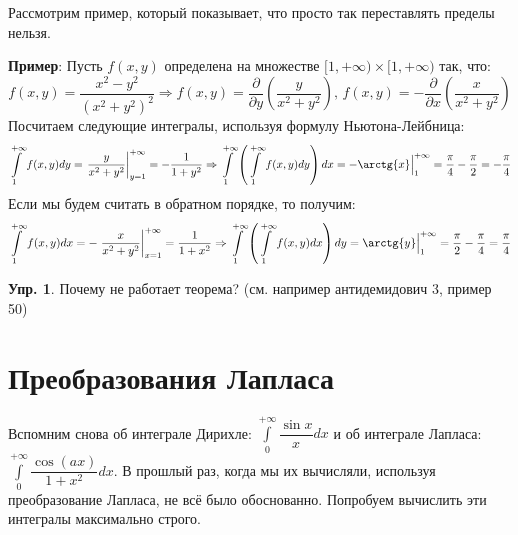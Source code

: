 \documentclass[12pt]{article}
\theoremstyle{definition}
\newtheorem{exrc}{Упр.}
\newcommand{\ddint}[2]{\displaystyle\int\limits_{#1}^{#2}}
\begin{document}
Рассмотрим пример, который показывает, что просто так переставлять пределы нельзя.

\textbf{Пример}: Пусть $f(x,y)$ определена на множестве $[1, +\infty)\times [1,+\infty)$ так, что:
$$
	f(x,y) = \dfrac{x^2 - y^2}{(x^2 + y^2)^2}\Rightarrow f(x,y) = \dfrac{\partial}{\partial y}\left(\dfrac{y}{x^2 + y^2}\right), \, f(x,y) = - \dfrac{\partial}{\partial  x}\left(\dfrac{x}{x^2 + y^2}\right)
$$
Посчитаем следующие интегралы, используя формулу Ньютона-Лейбница:
$$
	\ddint{1}{+\infty}f(x,y)dy = \left.\dfrac{y}{x^2 + y^2}\right|_{y= 1}^{+\infty} = -\dfrac{1}{1 + y^2} \Rightarrow \ddint{1}{+\infty}\left(\ddint{1}{+\infty}f(x,y)dy\right)dx = -\arctg{x}\Big|_{1}^{+\infty} = \dfrac{\pi}{4} - \dfrac{\pi}{2} = -\dfrac{\pi}{4}
$$
Если мы будем считать в обратном порядке, то получим:
$$
	\ddint{1}{+\infty}f(x,y)dx = -\left.\dfrac{x}{x^2 + y^2}\right|_{x= 1}^{+\infty} = \dfrac{1}{1 + x^2} \Rightarrow \ddint{1}{+\infty}\left(\ddint{1}{+\infty}f(x,y)dx\right)dy = \arctg{y}\Big|_{1}^{+\infty} = \dfrac{\pi}{2} - \dfrac{\pi}{4} = \dfrac{\pi}{4}
$$

\begin{exrc}
	Почему не работает теорема? (см. например антидемидович 3, пример 50)
\end{exrc}
\newpage
\section*{Преобразования Лапласа}
Вспомним снова об интеграле Дирихле: $\ddint{0}{+\infty}\dfrac{\sin{x}}{x}dx$
и об интеграле Лапласа: $\ddint{0}{+\infty}\dfrac{\cos{(ax)}}{1 + x^2}dx$. В прошлый раз, когда мы их вычисляли, используя преобразование Лапласа, не всё было обоснованно. Попробуем вычислить эти интегралы максимально строго.
\end{document}
